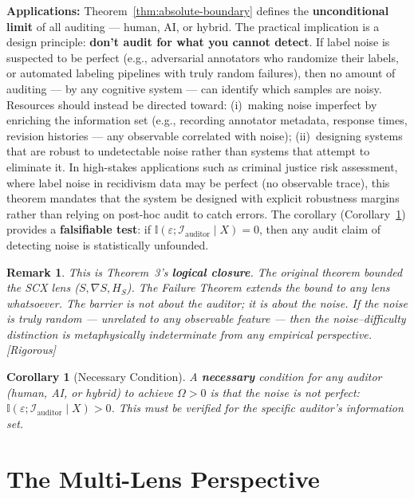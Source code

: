 \documentclass[12pt,a4paper]{article}
\newtheorem{corollary}[theorem]{Corollary}
\newtheorem{remark}[theorem]{Remark}
\newcommand{\rigorous}{\textcolor{green!50!black}{\small\textsf{[Rigorous]}}}
\newcommand{\I}{\mathbb{I}}
\newcommand{\cI}{\mathcal{I}}
\begin{document}
\medskip\noindent
\textbf{Applications:}
Theorem~\ref{thm:absolute-boundary} defines the \textbf{unconditional limit}
of all auditing — human, AI, or hybrid.  The practical implication is a design
principle: \textbf{don't audit for what you cannot detect}.  If label noise is
suspected to be perfect (e.g., adversarial annotators who randomize their
labels, or automated labeling pipelines with truly random failures), then
no amount of auditing — by any cognitive system — can identify which samples
are noisy.  Resources should instead be directed toward: (i)~making noise
imperfect by enriching the information set (e.g., recording annotator
metadata, response times, revision histories — any observable correlated
with noise); (ii)~designing systems that are robust to undetectable noise
rather than systems that attempt to eliminate it.  In high-stakes
applications such as criminal justice risk assessment, where label noise in
recidivism data may be perfect (no observable trace), this theorem mandates
that the system be designed with explicit robustness margins rather than
relying on post-hoc audit to catch errors.  The corollary
(Corollary~\ref{cor:necessary}) provides a \textbf{falsifiable test}: if
$\I(\varepsilon;\cI_{\mathrm{auditor}}\mid X)=0$, then any audit claim of
detecting noise is statistically unfounded.

\begin{remark}
This is Theorem~3's \textbf{logical closure}.  The original theorem bounded
the SCX lens ($S, \nabla S, H_S$).  The Failure Theorem extends the bound
to \emph{any lens whatsoever}.  The barrier is not about the auditor; it is
about the noise.  If the noise is truly random — unrelated to any observable
feature — then the noise--difficulty distinction is \emph{metaphysically}
indeterminate from any empirical perspective.  \rigorous
\end{remark}

\begin{corollary}[Necessary Condition]
\label{cor:necessary}
A \textbf{necessary} condition for \emph{any} auditor (human, AI, or hybrid)
to achieve $\Omega > 0$ is that the noise is \emph{not} perfect:
$\I(\varepsilon; \cI_{\mathrm{auditor}} \mid X) > 0$.  This must be
verified for the specific auditor's information set.
\end{corollary}

\section{The Multi-Lens Perspective}
\end{document}
